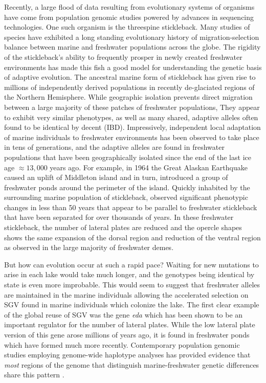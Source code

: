 \documentclass{article}
\begin{document}
Recently, a large flood of data resulting from evolutionary systems of organisms have come from population genomic studies powered by advances in sequencing technologies. 
One such organism is the threespine stickleback. 
Many studies of species have exhibited a long standing evolutionary history of migration-selection balance between marine and freshwater populations across the globe.
The rigidity of the stickleback's ability to frequently prosper in newly created freshwater environments has made this fish a good model for understanding the genetic basis of adaptive evolution. 
The ancestral marine form of stickleback has given rise to millions of independently derived populations in recently de-glaciated regions of the Northern Hemisphere.
While geographic isolation prevents direct migration between a large majority of these patches of freshwater populations,
They appear to exhibit very similar phenotypes, as well as many shared, adaptive alleles often found to be identical by decent (IBD). 
Impressively, independent local adaptation of marine individuals to freshwater environments has been observed to take place in tens of generations, 
and the adaptive alleles are found in freshwater populations that have been geographically isolated since the end of the last ice age $\approx 13,000$ years ago.
For example, in 1964 the Great Alaskan Earthquake caused an uplift of Middleton island and in turn, introduced a group of freshwater ponds around the perimeter of the island. 
Quickly inhabited by the surrounding marine population of stickleback, 
\citet{lescak2015evolution} observed significant phenotypic changes in less than 50 years that appear to be parallel to freshwater stickleback that have been separated for over thousands of years. 
In these freshwater stickleback, the number of lateral plates are reduced and the opercle shapes shows
the same expansion of the dorsal region and reduction of the ventral region as observed in the large majority of freshwater demes.

But how can evolution occur at such a rapid pace? 
Waiting for new mutations to arise in each lake would take much longer, and the genotypes being identical by state is even more improbable. 
This would seem to suggest that freshwater alleles are maintained in the marine individuals allowing the accelerated selection on SGV found in marine individuals which colonize the lake. 
The first clear example of the global reuse of SGV was the gene \textit{eda} which has been shown to be an important regulator for the number of lateral plates. 
While the low lateral plate version of this gene arose millions of years ago, it is found in freshwater ponds which have formed much more recently. 
Contemporary population genomic studies employing genome-wide haplotype analyses has provided evidence that \textit{most} regions of the genome that distinguish marine-freshwater genetic differences share this pattern \citep{nelson2017ancient}. 
 
\end{document}
